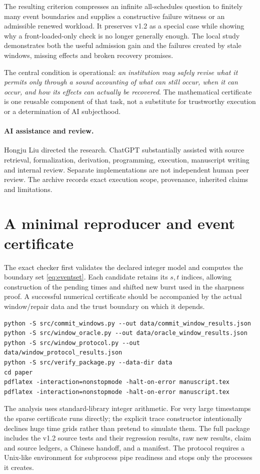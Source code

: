 \documentclass[11pt,a4paper]{article}
\theoremstyle{definition}\newtheorem{definition}{Definition}
\begin{document}
The resulting criterion compresses an infinite all-schedules question to finitely many event boundaries and supplies a constructive failure witness or an admissible renewed workload. It preserves v1.2 as a special case while showing why a front-loaded-only check is no longer generally enough. The local study demonstrates both the useful admission gain and the failures created by stale windows, missing effects and broken recovery promises.

The central condition is operational: \emph{an institution may safely revise what it permits only through a sound accounting of what can still occur, when it can occur, and how its effects can actually be recovered}. The mathematical certificate is one reusable component of that task, not a substitute for trustworthy execution or a determination of AI subjecthood.

\paragraph{AI assistance and review.}
Hongju Liu directed the research. ChatGPT substantially assisted with source retrieval, formalization, derivation, programming, execution, manuscript writing and internal review. Separate implementations are not independent human peer review. The archive records exact execution scope, provenance, inherited claims and limitations.

\appendix
\section{A minimal reproducer and event certificate}
The exact checker first validates the declared integer model and computes the boundary set \cref{eq:eventset}. Each candidate retains its $s,t$ indices, allowing construction of the pending times and shifted new burst used in the sharpness proof. A successful numerical certificate should be accompanied by the actual window/repair data and the trust boundary on which it depends.
\begin{lstlisting}
python -S src/commit_windows.py --out data/commit_window_results.json
python -S src/window_oracle.py --out data/oracle_window_results.json
python -S src/window_protocol.py --out data/window_protocol_results.json
python -S src/verify_package.py --data-dir data
cd paper
pdflatex -interaction=nonstopmode -halt-on-error manuscript.tex
pdflatex -interaction=nonstopmode -halt-on-error manuscript.tex
\end{lstlisting}
The analysis uses standard-library integer arithmetic. For very large timestamps the sparse certificate runs directly; the explicit trace constructor intentionally declines huge time grids rather than pretend to simulate them. The full package includes the v1.2 source tests and their regression results, raw new results, claim and source ledgers, a Chinese handoff, and a manifest. The protocol requires a Unix-like environment for subprocess pipe readiness and stops only the processes it creates.
\end{document}
